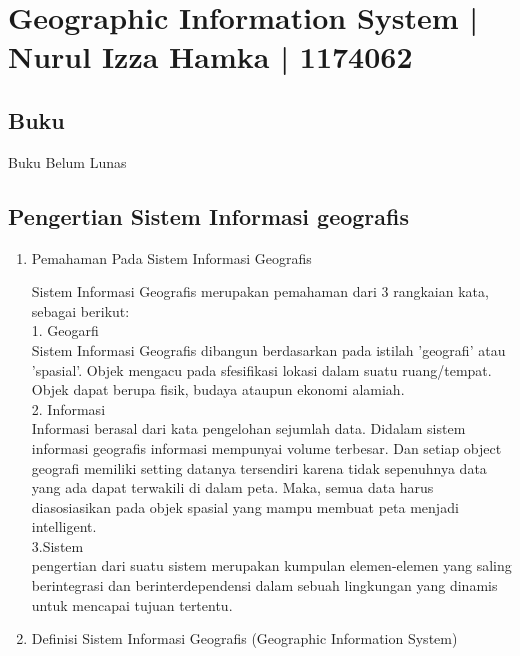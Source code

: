 
\section{Geographic Information System | Nurul Izza Hamka | 1174062}
\subsection{Buku}
Buku Belum Lunas
\subsection{Pengertian Sistem Informasi geografis}
\begin{enumerate}

\item Pemahaman Pada Sistem Informasi Geografis

Sistem Informasi Geografis merupakan pemahaman dari 3 rangkaian kata, sebagai berikut:\\
1. Geogarfi\\
Sistem Informasi Geografis dibangun berdasarkan pada istilah 'geografi' atau 'spasial'. Objek mengacu pada sfesifikasi  lokasi dalam suatu ruang/tempat. Objek dapat berupa fisik, budaya ataupun ekonomi alamiah.\\
2. Informasi\\
Informasi berasal dari kata pengelohan sejumlah data. Didalam sistem informasi geografis informasi mempunyai volume terbesar. Dan setiap object geografi memiliki setting datanya tersendiri karena tidak sepenuhnya data yang ada dapat terwakili di dalam peta. Maka, semua data harus diasosiasikan pada objek spasial yang mampu membuat peta menjadi intelligent.\\
3.Sistem\\
pengertian dari suatu sistem merupakan kumpulan elemen-elemen yang saling berintegrasi dan berinterdependensi dalam sebuah lingkungan yang dinamis untuk mencapai tujuan tertentu.\\

\item Definisi Sistem Informasi Geografis (Geographic Information System) 


\end{enumerate}
